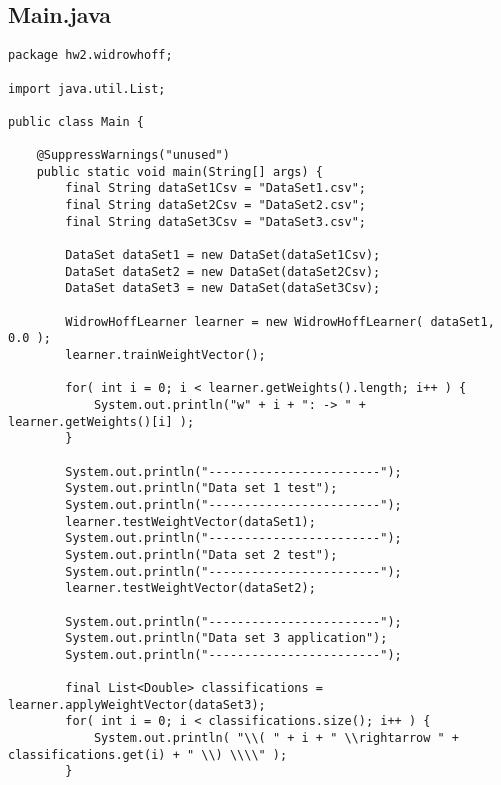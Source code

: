\subsection{ Main.java }
\begin{lstlisting}
package hw2.widrowhoff;

import java.util.List;

public class Main {

	@SuppressWarnings("unused")
	public static void main(String[] args) {
		final String dataSet1Csv = "DataSet1.csv";
		final String dataSet2Csv = "DataSet2.csv";
		final String dataSet3Csv = "DataSet3.csv";
		
		DataSet dataSet1 = new DataSet(dataSet1Csv);
		DataSet dataSet2 = new DataSet(dataSet2Csv);
		DataSet dataSet3 = new DataSet(dataSet3Csv);
		
		WidrowHoffLearner learner = new WidrowHoffLearner( dataSet1, 0.0 );
		learner.trainWeightVector();
		
		for( int i = 0; i < learner.getWeights().length; i++ ) {
			System.out.println("w" + i + ": -> " + learner.getWeights()[i] );
		}
		
		System.out.println("------------------------");
		System.out.println("Data set 1 test");
		System.out.println("------------------------");
		learner.testWeightVector(dataSet1);
		System.out.println("------------------------");
		System.out.println("Data set 2 test");
		System.out.println("------------------------");
		learner.testWeightVector(dataSet2);
		
		System.out.println("------------------------");
		System.out.println("Data set 3 application");
		System.out.println("------------------------");
		
		final List<Double> classifications = learner.applyWeightVector(dataSet3);
		for( int i = 0; i < classifications.size(); i++ ) {
			System.out.println( "\\( " + i + " \\rightarrow " + classifications.get(i) + " \\) \\\\" );
		}
		

\end{lstlisting}

